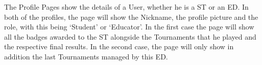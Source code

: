 The Profile Pages show the details of a User, whether he is a ST or an ED. In both of the profiles, the page will show the Nickname, the profile picture and the role, with this being ‘Student’ or ‘Educator’. In the first case the page will show all the badges awarded to the ST alongside the Tournaments that he played and the respective final results. In the second case, the page will only show in addition the last Tournaments managed by this ED.




